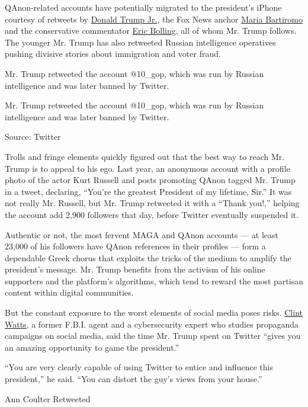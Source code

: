 QAnon-related accounts have potentially migrated to the president's
iPhone courtesy of retweets by
\href{https://twitter.com/DonaldJTrumpJr?ref_src=twsrc\%5Egoogle\%7Ctwcamp\%5Eserp\%7Ctwgr\%5Eauthor}{Donald
Trump Jr.}, the Fox News anchor
\href{https://www.foxbusiness.com/person/b/maria-bartiromo}{Maria
Bartiromo} and the conservative commentator
\href{https://static.macmillan.com/static/smp/eric-bolling/}{Eric
Bolling}, all of whom Mr. Trump follows. The younger Mr. Trump has also
retweeted Russian intelligence operatives pushing divisive stories about
immigration and voter fraud.

Mr. Trump retweeted the account @10\_gop, which was run by Russian
intelligence and was later banned by Twitter.

Mr. Trump retweeted the account @10\_gop, which was run by Russian
intelligence and was later banned by Twitter.

Source: Twitter

Trolls and fringe elements quickly figured out that the best way to
reach Mr. Trump is to appeal to his ego. Last year, an anonymous account
with a profile photo of the actor Kurt Russell and posts promoting QAnon
tagged Mr. Trump in a tweet, declaring, ``You're the greatest President
of my lifetime, Sir.'' It was not really Mr. Russell, but Mr. Trump
retweeted it with a ``Thank you!,'' helping the account add 2,900
followers that day, before Twitter eventually suspended it.

Authentic or not, the most fervent MAGA and QAnon accounts --- at least
23,000 of his followers have QAnon references in their profiles --- form
a dependable Greek chorus that exploits the tricks of the medium to
amplify the president's message. Mr. Trump benefits from the activism of
his online supporters and the platform's algorithms, which tend to
reward the most partisan content within digital communities.

But the constant exposure to the worst elements of social media poses
risks. \href{https://www.fpri.org/contributor/clint-watts/}{Clint
Watts}, a former F.B.I. agent and a cybersecurity expert who studies
propaganda campaigns on social media, said the time Mr. Trump spent on
Twitter ``gives you an amazing opportunity to game the president.''

``You are very clearly capable of using Twitter to entice and influence
this president,'' he said. ``You can distort the guy's views from your
house.''

Ann Coulter Retweeted


